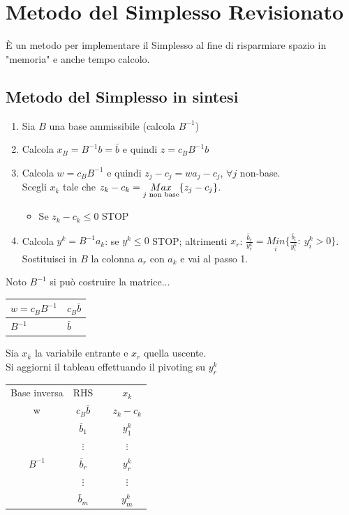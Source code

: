 \section{Metodo del Simplesso Revisionato}
È un metodo per implementare il Simplesso al fine di risparmiare spazio in "memoria" e anche tempo calcolo.

\subsection{Metodo del Simplesso in sintesi}
\begin{enumerate}
	\item Sia $B$ una base ammissibile (calcola $B^{-1}$)
	\item Calcola $x_{B}=B^{-1}b=\bar{b}$ e quindi $z=c_{B}B^{-1}b$
	\item Calcola $w=c_{B}B^{-1}$ e quindi $z_{j}-c_{j}=w a_{j}-c_{j}$, $\forall j$ non-base.\\
	Scegli $x_{k}$ tale che $z_{k}-c_{k}=\underset{j \textnormal{ non base}}{Max}\{z_{j}-c_{j}\}$.
	\begin{itemize}
		\item Se $z_{k}-c_{k}\le 0$ STOP
	\end{itemize}
	\item Calcola $y^{k}=B^{-1}a_{k}$: se $y^{k}\le 0$ STOP; altrimenti
	$x_{r}$: $\frac{\bar{b}_{r}}{y^{k}_{r}}=\underset{i}{Min}\{\frac{\bar{b}_{i}}{y_{i}^{k}}:\ y_{i}^{k}>0\}$.\\
	Sostituisci in $B$ la colonna $a_{r}$ con $a_{k}$ e vai al passo 1.
\end{enumerate}

Noto $B^{-1}$ si può costruire la matrice...
\begin{table}[h]
	\centering
	\begin{tabular}{|l|l|}
		\hline
		$w=c_{B}B^{-1}$ & $c_{B}\bar{b}$ \\ \hline
		$B^{-1}$ & $\bar{b}$ \\ \hline 
	\end{tabular}
\end{table}

Sia $x_{k}$ la variabile entrante e $x_{r}$ quella uscente.\\
Si aggiorni il tableau effettuando il pivoting su $y_{r}^{k}$
\begin{table}[h]
	\centering
	\def\arraystretch{1.3}
	\begin{tabular}{|c|c|c|c|}
		\multicolumn{1}{c}{Base inversa} & \multicolumn{1}{c}{RHS} & \multicolumn{1}{c}{} & \multicolumn{1}{c}{$x_{k}$} \\ \cline{1-2}\cline{4-4}
		w & $c_{B}\bar{b}$ &  & $z_{k}-c_{k}$ \\ \cline{1-2}\cline{4-4}
		& $\bar{b}_{1}$ &  & $y_{1}^{k}$ \\
		& $\vdots$ &  & $\vdots$ \\
		$B^{-1}$ & $\bar{b}_{r}$ &  & {\LARGE \textcircled{\normalsize $y_{r}^{k}$}} \\
		& $\vdots$ &  & $\vdots$ \\
		& $\bar{b}_{m}$ &  & $y_{m}^{k}$ \\ \cline{1-2}\cline{4-4}
	\end{tabular}
\end{table}

